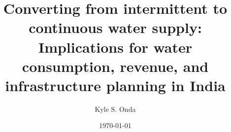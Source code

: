 
\title{Converting from intermittent to continuous water supply: Implications for water
consumption, revenue, and infrastructure planning in India}
\author{Kyle S. Onda}
\date{\today}





\pagestyle{plain}

\frontmatter


\maketitlepg
\makecopyrightpage
\makeabstractpg
\makededicationpg




%

% 
\newlength{\oldbaselineskip}
\setlength{\oldbaselineskip}{\the\baselineskip}
\newlength{\oldparskip}
\setlength{\oldparskip}{\the\parskip}

\setlength{\baselineskip}{0.5\oldbaselineskip}
\setlength{\parskip}{0.5\oldbaselineskip}




\renewcommand{\contentsname}{TABLE OF CONTENTS}
\renewcommand{\cfttoctitlefont}{\textbf}
\renewcommand{\cftaftertoctitle}{\hfill}
\renewcommand{\cftdotsep}{1.5}
\cftsetrmarg{1.0in}

